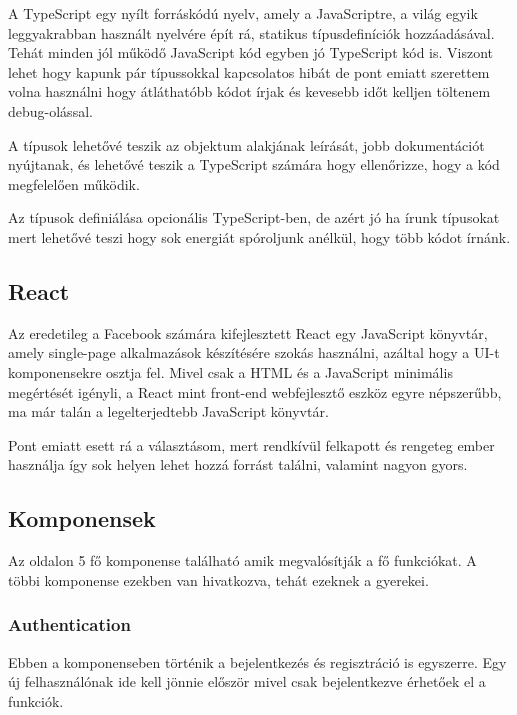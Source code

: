 A TypeScript egy nyílt forráskódú nyelv, amely a JavaScriptre, a világ egyik leggyakrabban használt nyelvére épít rá, statikus típusdefiníciók hozzáadásával. Tehát minden jól működő JavaScript kód egyben jó TypeScript kód is. Viszont lehet hogy kapunk pár típussokkal kapcsolatos hibát de pont emiatt szerettem volna használni hogy átláthatóbb kódot írjak és kevesebb időt kelljen töltenem debug-olással. \bigskip

A típusok lehetővé teszik az objektum alakjának leírását, jobb dokumentációt nyújtanak, és lehetővé teszik a TypeScript számára hogy ellenőrizze, hogy a kód megfelelően működik.\bigskip

Az típusok definiálása opcionális TypeScript-ben, de azért jó ha írunk típusokat mert lehetővé teszi hogy sok energiát spóroljunk anélkül, hogy több kódot írnánk.

\subsection{React}

Az eredetileg a Facebook számára kifejlesztett React egy JavaScript könyvtár, amely single-page alkalmazások készítésére szokás használni, azáltal hogy a UI-t komponensekre osztja fel. Mivel csak a HTML és a JavaScript  minimális megértését igényli, a React mint front-end webfejlesztő eszköz egyre népszerűbb, ma már talán a legelterjedtebb JavaScript könyvtár. \bigskip

Pont emiatt esett rá a választásom, mert rendkívül felkapott és rengeteg ember használja így sok helyen lehet hozzá forrást találni, valamint nagyon gyors.

\subsection{Komponensek}

Az oldalon 5 fő komponense található amik megvalósítják a fő funkciókat. A többi komponense ezekben van hivatkozva, tehát ezeknek a gyerekei.

\subsubsection{Authentication}

Ebben a komponenseben történik a bejelentkezés és regisztráció is egyszerre. Egy új felhasználónak ide kell jönnie először mivel csak bejelentkezve érhetőek el a funkciók.


